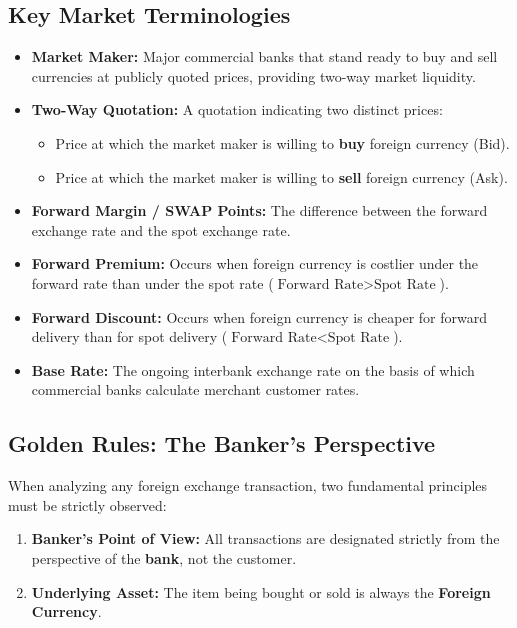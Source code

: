 \subsection{Key Market Terminologies}
\begin{itemize}[leftmargin=*]
    \item \textbf{Market Maker:} Major commercial banks that stand ready to buy and sell currencies at publicly quoted prices, providing two-way market liquidity.
    \item \textbf{Two-Way Quotation:} A quotation indicating two distinct prices:
    \begin{itemize}[noitemsep]
        \item Price at which the market maker is willing to \textbf{buy} foreign currency (Bid).
        \item Price at which the market maker is willing to \textbf{sell} foreign currency (Ask).
    \end{itemize}
    \item \textbf{Forward Margin / SWAP Points:} The difference between the forward exchange rate and the spot exchange rate.
    \item \textbf{Forward Premium:} Occurs when foreign currency is costlier under the forward rate than under the spot rate ($\text{Forward Rate} > \text{Spot Rate}$).
    \item \textbf{Forward Discount:} Occurs when foreign currency is cheaper for forward delivery than for spot delivery ($\text{Forward Rate} < \text{Spot Rate}$).
    \item \textbf{Base Rate:} The ongoing interbank exchange rate on the basis of which commercial banks calculate merchant customer rates.
\end{itemize}

\subsection{Golden Rules: The Banker's Perspective}
When analyzing any foreign exchange transaction, two fundamental principles must be strictly observed:
\begin{formulabox}
\begin{enumerate}[leftmargin=*, noitemsep]
    \item \textbf{Banker's Point of View:} All transactions are designated strictly from the perspective of the \textbf{bank}, not the customer.
    \item \textbf{Underlying Asset:} The item being bought or sold is always the \textbf{Foreign Currency}.
\end{enumerate}
\end{formulabox}

